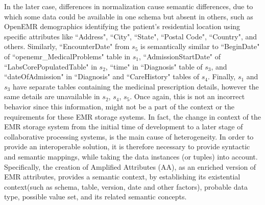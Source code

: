 In the later case, differences in normalization cause semantic differences, due to which some data could be available in one schema but absent in others, such as OpenEMR demographics identifying the patient's residential location using specific attributes like ``Address", ``City", ``State", ``Postal Code", ``Country", and others. Similarly, ``EncounterDate" from $s_5$ is semantically similar to ``BeginDate" of ``openemr\_MedicalProblems" table in $s_1$, ``AdmissionStartDate" of ``LabsCorePopulatedTable" in $s_2$, 
``time" in ``Diagnosis" table of $s_3$, and  ``dateOfAdmission" in ``Diagnosis" and ``CareHistory" tables of $s_4$.
Finally, $s_1$ and $s_3$ have separate tables containing the medicinal prescription details, however the same details are unavailable in $s_2$, $s_4$, $s_5$. Once again, this is not an incorrect behavior since this information, might not be a part of the context or the requirements for these EMR storage systems.
In fact, the change in context of the EMR storage system from the initial time of development to a later stage of collaborative processing systems, is the main cause of heterogeneity. In order to provide an interoperable solution, it is therefore necessary to provide syntactic and semantic mappings, while taking the data instances (or tuples) into account. Specifically, the creation of Amplified Attributes (AA), as an enriched version of EMR attributes, provides a semantic context, by establishing its existential context(such as schema, table, version, date and other factors), probable data type, possible value set, and its related semantic concepts. 

